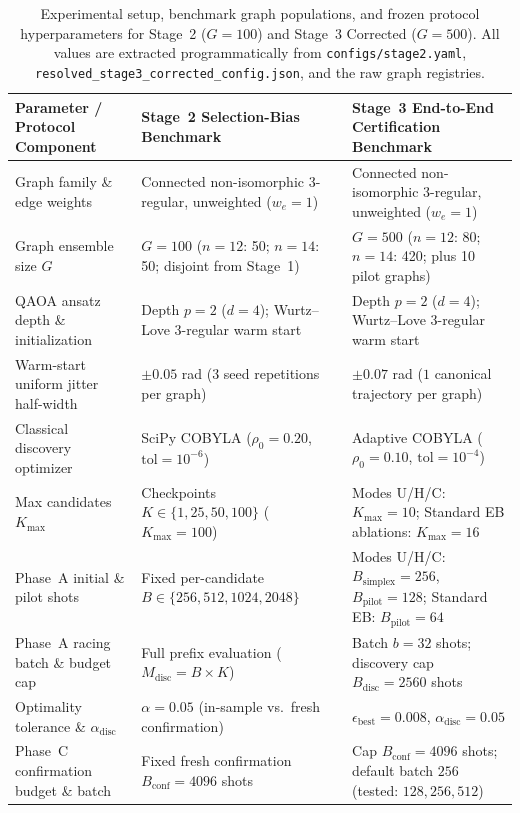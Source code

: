 \begin{table}[htbp]
\caption{Experimental setup, benchmark graph populations, and frozen protocol hyperparameters for Stage~2 ($G=100$) and Stage~3 Corrected ($G=500$). All values are extracted programmatically from \texttt{configs/stage2.yaml}, \texttt{resolved\_stage3\_corrected\_config.json}, and the raw graph registries.}
\label{tab:setup}
\centering
\footnotesize
\begin{tabular}{@{}p{4.4cm} p{5.6cm} p{6.8cm}@{}}
\toprule
Parameter / Protocol Component & Stage~2 Selection-Bias Benchmark & Stage~3 End-to-End Certification Benchmark \\
\midrule
Graph family \& edge weights & Connected non-isomorphic 3-regular, unweighted ($w_e=1$) & Connected non-isomorphic 3-regular, unweighted ($w_e=1$) \\
Graph ensemble size $G$ & $G=100$ ($n=12$: 50; $n=14$: 50; disjoint from Stage~1) & $G=500$ ($n=12$: 80; $n=14$: 420; plus 10 pilot graphs) \\
QAOA ansatz depth \& initialization & Depth $p=2$ ($d=4$); Wurtz--Love 3-regular warm start & Depth $p=2$ ($d=4$); Wurtz--Love 3-regular warm start \\
Warm-start uniform jitter half-width & $\pm 0.05$ rad ($3$ seed repetitions per graph) & $\pm 0.07$ rad ($1$ canonical trajectory per graph) \\
Classical discovery optimizer & SciPy COBYLA ($\rho_0 = 0.20$, $\mathrm{tol} = 10^{-6}$) & Adaptive COBYLA ($\rho_0 = 0.10$, $\mathrm{tol} = 10^{-4}$) \\
Max candidates $K_{\max}$ & Checkpoints $K \in \{1, 25, 50, 100\}$ ($K_{\max}=100$) & Modes U/H/C: $K_{\max}=10$; Standard EB ablations: $K_{\max}=16$ \\
Phase~A initial \& pilot shots & Fixed per-candidate $B \in \{256, 512, 1024, 2048\}$ & Modes U/H/C: $B_{\mathrm{simplex}}=256$, $B_{\mathrm{pilot}}=128$; Standard EB: $B_{\mathrm{pilot}}=64$ \\
Phase~A racing batch \& budget cap & Full prefix evaluation ($M_{\mathrm{disc}} = B \times K$) & Batch $b = 32$ shots; discovery cap $B_{\mathrm{disc}} = 2560$ shots \\
Optimality tolerance \& $\alpha_{\mathrm{disc}}$ & $\alpha = 0.05$ (in-sample vs.\ fresh confirmation) & $\epsilon_{\mathrm{best}} = 0.008$, $\alpha_{\mathrm{disc}} = 0.05$ \\
Phase~C confirmation budget \& batch & Fixed fresh confirmation $B_{\mathrm{conf}} = 4096$ shots & Cap $B_{\mathrm{conf}} = 4096$ shots; default batch $256$ (tested: $128, 256, 512$) \\

\end{tabular}
\end{table}
